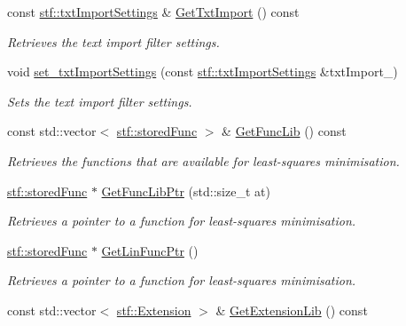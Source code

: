 \begin{DoxyCompactItemize}
const \hyperlink{structstf_1_1txtImportSettings}{stf::txtImportSettings} \& \hyperlink{classwxStfApp_af7fcc335ab5df92c0df0eeb846d22476}{GetTxtImport} () const 
\begin{DoxyCompactList}\small\item\em Retrieves the text import filter settings. \item\end{DoxyCompactList}\item 
void \hyperlink{classwxStfApp_a6f94ead9d8e03baf99d3deec56582920}{set\_\-txtImportSettings} (const \hyperlink{structstf_1_1txtImportSettings}{stf::txtImportSettings} \&txtImport\_\-)
\begin{DoxyCompactList}\small\item\em Sets the text import filter settings. \item\end{DoxyCompactList}\item 
const std::vector$<$ \hyperlink{structstf_1_1storedFunc}{stf::storedFunc} $>$ \& \hyperlink{classwxStfApp_aa46d93e619d2698aa807390c51980f3e}{GetFuncLib} () const 
\begin{DoxyCompactList}\small\item\em Retrieves the functions that are available for least-\/squares minimisation. \item\end{DoxyCompactList}\item 
\hyperlink{structstf_1_1storedFunc}{stf::storedFunc} $\ast$ \hyperlink{classwxStfApp_a68cc63c9e6d555e364f6ac175e27016e}{GetFuncLibPtr} (std::size\_\-t at)
\begin{DoxyCompactList}\small\item\em Retrieves a pointer to a function for least-\/squares minimisation. \item\end{DoxyCompactList}\item 
\hyperlink{structstf_1_1storedFunc}{stf::storedFunc} $\ast$ \hyperlink{classwxStfApp_a9d5cbe83f3a3329c3649c3374004b87f}{GetLinFuncPtr} ()
\begin{DoxyCompactList}\small\item\em Retrieves a pointer to a function for least-\/squares minimisation. \item\end{DoxyCompactList}\item 
const std::vector$<$ \hyperlink{structstf_1_1Extension}{stf::Extension} $>$ \& \hyperlink{classwxStfApp_a29f0f699a0545eb4ae8219ec83c4aa0a}{GetExtensionLib} () const 

\end{DoxyCompactItemize}
